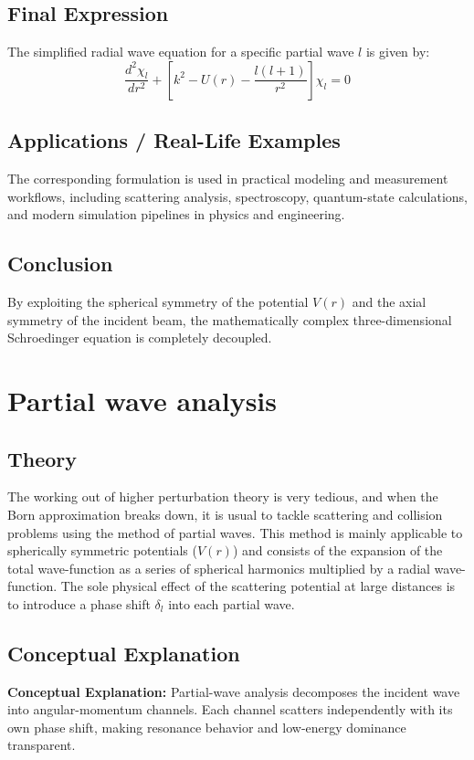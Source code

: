 \documentclass[12pt]{report}
\begin{document}
\subsection*{Final Expression}
The simplified radial wave equation for a specific partial wave $l$ is given by:
\begin{equation}
\boxed{ \frac{d^2 \chi_l}{dr^2} + \left[ k^2 - U(r) - \frac{l(l+1)}{r^2} \right] \chi_l = 0 }
\end{equation}

\subsection*{Applications / Real-Life Examples}
The corresponding formulation is used in practical modeling and measurement workflows, including scattering analysis, spectroscopy, quantum-state calculations, and modern simulation pipelines in physics and engineering.

\subsection*{Conclusion}
By exploiting the spherical symmetry of the potential $V(r)$ and the axial symmetry of the incident beam, the mathematically complex three-dimensional Schroedinger equation is completely decoupled.

\section{Partial wave analysis}



\subsection*{Theory}
The working out of higher perturbation theory is very tedious, and when the Born approximation breaks down, it is usual to tackle scattering and collision problems using the method of partial waves. This method is mainly applicable to spherically symmetric potentials ($V(r)$) and consists of the expansion of the total wave-function as a series of spherical harmonics multiplied by a radial wave-function. The sole physical effect of the scattering potential at large distances is to introduce a phase shift $\delta_l$ into each partial wave.


\subsection{Conceptual Explanation}
\textbf{Conceptual Explanation:} Partial-wave analysis decomposes the incident wave into angular-momentum channels. Each channel scatters independently with its own phase shift, making resonance behavior and low-energy dominance transparent.
\end{document}
